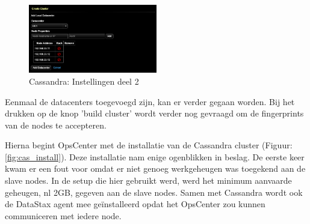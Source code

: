 \begin{figure}[H]
  	\centering
    \includegraphics[width=0.5\textwidth]{img/4_installatie_cassandra/1_Configuration_part_2}
    \caption{Cassandra: Instellingen deel 2}
    \label{fig:cas_conf_2}
\end{figure}

Eenmaal de datacenters toegevoegd zijn, kan er verder gegaan worden.
Bij het drukken op de knop 'build cluster' wordt verder nog gevraagd om de fingerprints van de nodes te accepteren.

Hierna begint OpsCenter met de installatie van de Cassandra cluster (Figuur: \ref{fig:cas_install}).
Deze installatie nam enige ogenblikken in beslag.
De eerste keer kwam er een fout voor omdat er niet genoeg werkgeheugen was toegekend aan de slave nodes.
In de setup die hier gebruikt werd, werd het minimum aanvaarde geheugen, nl 2GB, gegeven aan de slave nodes.
Samen met Cassandra wordt ook de DataStax agent mee geïnstalleerd opdat het OpsCenter zou kunnen communiceren met iedere node.

